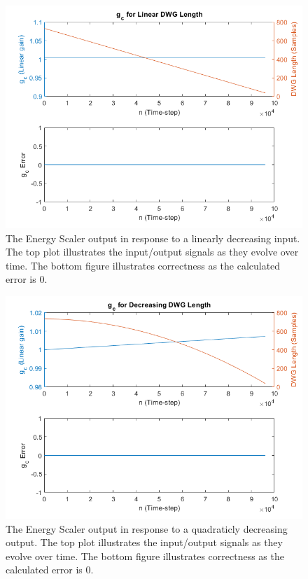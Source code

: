 \documentclass[../main.tex]{subfiles}
\begin{document}
\begin{figure}[h!]
    \centering
    \includegraphics[scale=.60]{./images/plots/EnergyScalerLinearDecreasing.png}
    \caption{The Energy Scaler output in response to a linearly decreasing input. The top plot illustrates the input/output signals as they evolve over time. The bottom figure illustrates correctness as the calculated error is 0.}
    \label{fig:EnergyScalerLinDec}
\end{figure}

\clearpage

\begin{figure}[h!]
    \centering
    \includegraphics[scale=.63]{./images/plots/EnergyScalerQuadraticDecreasing.png}
    \caption{The Energy Scaler output in response to a quadraticly decreasing output. The top plot illustrates the input/output signals as they evolve over time. The bottom figure illustrates correctness as the calculated error is 0.}
    \label{fig:EnergyScalerQuadDec}
\end{figure}
\end{document}
